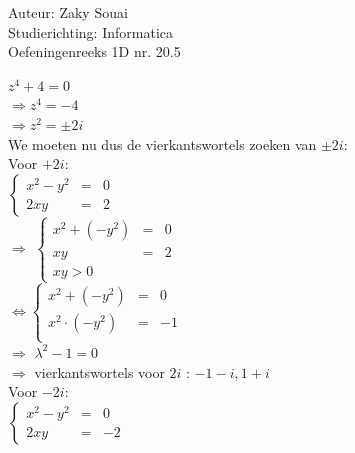 \documentclass[a4paper]{article}
\begin{document}
  
\noindent \large Auteur: Zaky Souai \\
\noindent \large Studierichting:  Informatica\\
\noindent \large Oefeningenreeks 1D nr. 20.5\\

\bigskip

\normalsize

$ z^4 +4 = 0$\\

$ \Rightarrow z^4 = -4 $ \\

$ \Rightarrow z^2 = \pm{2i} $ \\

We moeten nu dus de vierkantswortels zoeken van $\pm{2i}$:\\

Voor $+2i$: \\

$\left\{
    \begin{array}{lll} 
        x^2 - y^2 &=& 0 \\
        2xy &=& 2
    \end{array}
\right .$\\

$\Rightarrow$ $\left\{
    \begin{array}{lll} 
        x^2 + (-y^2) &=& 0 \\
        xy &=& 2 \\
        xy > 0
    \end{array}
\right .$\\

$\Leftrightarrow \left\{
    \begin{array}{lll} 
        x^2 + (-y^2) &=& 0 \\
        x^2 \cdot (-y^2) &=& -1 \\
    \end{array}
\right .$\\

$\Rightarrow$ $ \lambda^2 -1 = 0 $ \\

$\Rightarrow $ vierkantswortels voor $2i$ : ${-1-i,1+i}$\\

Voor $-2i$: \\

$\left\{
    \begin{array}{lll} 
        x^2 - y^2 &=& 0 \\
        2xy &=& -2
    \end{array}
\right .$\\
\end{document}
